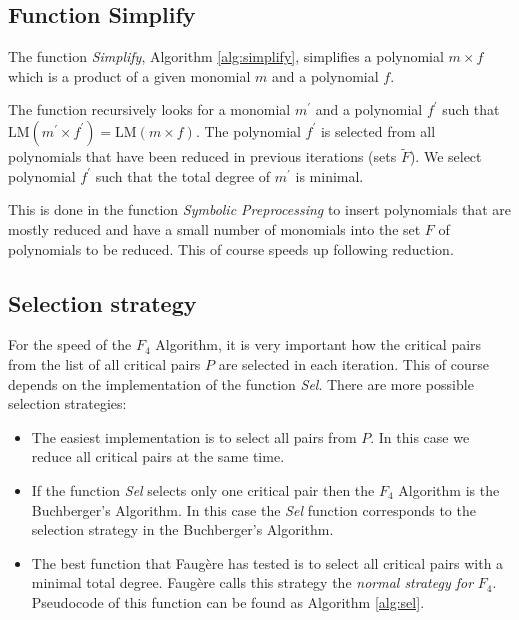 

\subsection{Function Simplify}
The function \textit{Simplify}, Algorithm \ref{alg:simplify}, simplifies a polynomial $m \times f$ which is a product of a given monomial $m$ and a polynomial $f$.

The function recursively looks for a monomial $m^\prime$ and a polynomial $f^\prime$ such that $\textrm{LM}(m^\prime\times f^\prime) = \textrm{LM}(m\times f)$. The polynomial $f^\prime$ is selected from all polynomials that have been reduced in previous iterations (sets $\tilde{F}$). We select polynomial $f^\prime$ such that the total degree of $m^\prime$ is minimal.

This is done in the function \textit{Symbolic Preprocessing} to insert polynomials that are mostly reduced and have a small number of monomials into the set $F$ of polynomials to be reduced. This of course speeds up following reduction.



\subsection{Selection strategy}
\label{subsec:F4:sel}
For the speed of the $F_4$ Algorithm, it is very important how the critical pairs from the list of all critical pairs $P$ are selected in each iteration. This of course depends on the implementation of the function \textit{Sel}. There are more possible selection strategies:

\begin{itemize}
  \item The easiest implementation is to select all pairs from $P$. In this case we reduce all critical pairs at the same time.
  \item If the function \textit{Sel} selects only one critical pair then the $F_4$ Algorithm is the Buchberger's Algorithm. In this case the \textit{Sel} function corresponds to the selection strategy in the Buchberger's Algorithm.
  \item The best function that Faug\`ere has tested is to select all critical pairs with a minimal total degree. Faug\`ere calls this strategy the \textit{normal strategy for} $F_4$. Pseudocode of this function can be found as Algorithm \ref{alg:sel}.
\end{itemize}

